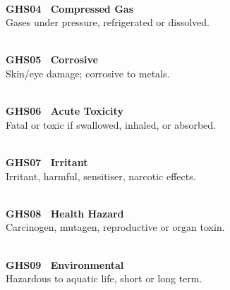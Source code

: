 \noindent
\begin{minipage}[t]{0.31\linewidth}\vspace{0pt}
\centering \ghsGas{1.6cm} \\[3pt]
{\bfseries\color{hazardred}GHS04 \textbullet\ Compressed Gas} \\[1pt]
{\footnotesize Gases under pressure, refrigerated or dissolved.}
\end{minipage}%
\hfill
\begin{minipage}[t]{0.31\linewidth}\vspace{0pt}
\centering \ghsCorrosive{1.6cm} \\[3pt]
{\bfseries\color{hazardred}GHS05 \textbullet\ Corrosive} \\[1pt]
{\footnotesize Skin/eye damage; corrosive to metals.}
\end{minipage}%
\hfill
\begin{minipage}[t]{0.31\linewidth}\vspace{0pt}
\centering \ghsToxic{1.6cm} \\[3pt]
{\bfseries\color{hazardred}GHS06 \textbullet\ Acute Toxicity} \\[1pt]
{\footnotesize Fatal or toxic if swallowed, inhaled, or absorbed.}
\end{minipage}

\par\vspace{10pt}

\noindent
\begin{minipage}[t]{0.31\linewidth}\vspace{0pt}
\centering \ghsExclamation{1.6cm} \\[3pt]
{\bfseries\color{hazardred}GHS07 \textbullet\ Irritant} \\[1pt]
{\footnotesize Irritant, harmful, sensitiser, narcotic effects.}
\end{minipage}%
\hfill
\begin{minipage}[t]{0.31\linewidth}\vspace{0pt}
\centering \ghsHealthHazard{1.6cm} \\[3pt]
{\bfseries\color{hazardred}GHS08 \textbullet\ Health Hazard} \\[1pt]
{\footnotesize Carcinogen, mutagen, reproductive or organ toxin.}
\end{minipage}%
\hfill
\begin{minipage}[t]{0.31\linewidth}\vspace{0pt}
\centering \ghsEnvironment{1.6cm} \\[3pt]
{\bfseries\color{hazardred}GHS09 \textbullet\ Environmental} \\[1pt]
{\footnotesize Hazardous to aquatic life, short or long term.}
\end{minipage}


